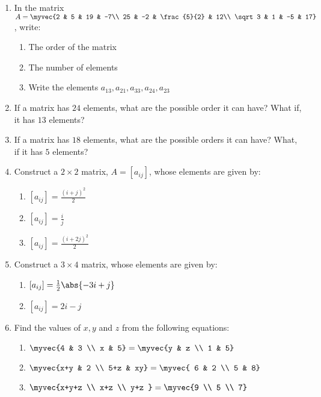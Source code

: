 \begin{enumerate}
\item In the matrix $A=\myvec
{2 & 5 & 19 & -7\\
25 & -2 & \frac{5}{2} & 12\\
\sqrt 3 & 1 & -5 & 17}$, write:
\begin{enumerate}[label=(\roman*)]
\item The order of the matrix
\item The number of elements
\item Write the elements $a_{13}, a_{21}, a_{33}, a_{24}, a_{23}$
\end{enumerate}
\item If a matrix has $24$ elements, what are the possible order it can have? What if, it has $13$ elements?
\item If a matrix has $18$ elements, what are the possible orders it can have? What, if it has $5$ elements?
\item Construct a $2\times 2$ matrix, $A=[a_{ij}]$, whose elements are given by:
\begin{enumerate}[label=(\roman*)]
\item $[a_{ij}]=\frac{(i+j)^2}{2}$
\item $[a_{ij}]=\frac{i}{j}$
\item $[a_{ij}]=\frac{(i+2j)^2}{2}$
\end{enumerate}
\item Construct a $3\times 4$ matrix, whose elements are given by:
\begin{enumerate}[label=(\roman*)]
\item $[a_{ij}]=\frac{1}{2}\abs{-3i+j}$
\item $[a_{ij}]=2i-j$
\end{enumerate}
\item Find the values of $x, y$ and $z$ from the following equations:
\begin{enumerate}[label=(\roman*)]
\item $\myvec
{4 & 3 \\ x & 5}= 
\myvec{y & z \\ 1 & 5}$
\item $\myvec
{x+y & 2 \\ 5+z & xy}=
\myvec{ 6 &  2 \\  5  & 8}$
\item $\myvec
{x+y+z \\ x+z \\ y+z }=
\myvec{9 \\ 5 \\  7}$

\end{enumerate}
\end{enumerate}
